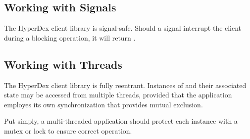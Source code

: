 
\pagebreak

\subsection{Working with Signals}
\label{sec:api:c:client:signals}

The HyperDex client library is signal-safe.  Should a signal interrupt the
client during a blocking operation, it will return
.

\subsection{Working with Threads}
\label{sec:api:c:client:threads}

The HyperDex client library is fully reentrant.  Instances of  and their associated state may be accessed from multiple
threads, provided that the application employes its own synchronization that
provides mutual exclusion.

Put simply, a multi-threaded application should protect each  instance with a mutex or lock to ensure correct operation.
